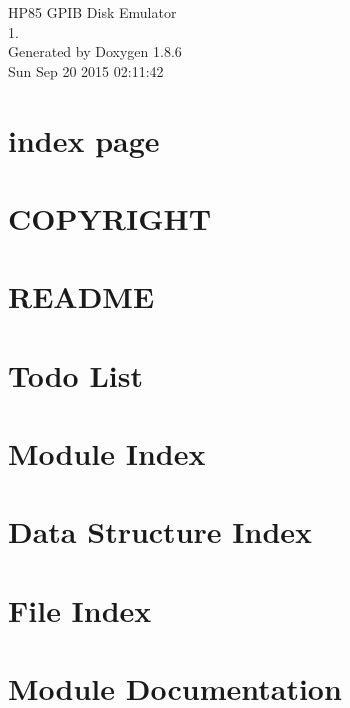 \documentclass[twoside]{book}
\newcommand{\clearemptydoublepage}{%
  \newpage{\pagestyle{empty}\cleardoublepage}%
}
\begin{document}
\hypersetup{pageanchor=false}
\begin{titlepage}
\vspace*{7cm}
\begin{center}%
{\Large H\-P85 G\-P\-I\-B Disk Emulator \\[1ex]\large 1. }\\
\vspace*{1cm}
{\large Generated by Doxygen 1.8.6}\\
\vspace*{0.5cm}
{\small Sun Sep 20 2015 02:11:42}\\
\end{center}
\end{titlepage}
\clearemptydoublepage
\tableofcontents
\clearemptydoublepage
{}
\hypersetup{pageanchor=true}

\chapter{index page}
\label{index}\hypertarget{index}{}
\chapter{C\-O\-P\-Y\-R\-I\-G\-H\-T}
\label{md_COPYRIGHT}
\hypertarget{md_COPYRIGHT}{}

\chapter{R\-E\-A\-D\-M\-E}
\label{md_README}
\hypertarget{md_README}{}

\chapter{Todo List}
\label{todo}
\hypertarget{todo}{}

\chapter{Module Index}

\chapter{Data Structure Index}

\chapter{File Index}

\chapter{Module Documentation}

\end{document}
